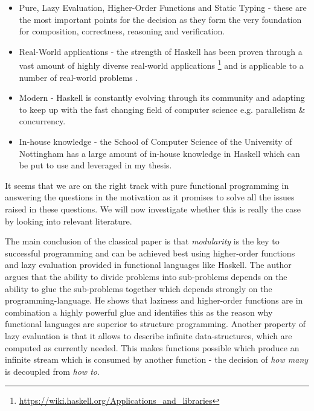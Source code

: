 \begin{itemize}
	\item Pure, Lazy Evaluation, Higher-Order Functions and Static Typing - these are the most important points for the decision as they form the very foundation for composition, correctness, reasoning and verification. 
	\item Real-World applications - the strength of Haskell has been proven through a vast amount of highly diverse real-world applications \footnote{\url{https://wiki.haskell.org/Applications_and_libraries}} \cite{hudak_history_2007} and is applicable to a number of real-world problems \cite{osullivan_real_2008}.
	\item Modern - Haskell is constantly evolving through its community and adapting to keep up with the fast changing field of computer science e.g. parallelism \& concurrency.
	\item In-house knowledge - the School of Computer Science of the University of Nottingham has a large amount of in-house knowledge in Haskell which can be put to use and leveraged in my thesis.
\end{itemize}

It seems that we are on the right track with pure functional programming in answering the questions in the motivation as it promises to solve all the issues raised in these questions. We will now investigate whether this is really the case by looking into relevant literature.

The main conclusion of the classical paper \cite{hughes_why_1989} is that \textit{modularity} is the key to successful programming and can be achieved best using higher-order functions and lazy evaluation provided in functional languages like Haskell. The author argues that the ability to divide problems into sub-problems depends on the ability to glue the sub-problems together which depends strongly on the programming-language. He shows that laziness and higher-order functions are in combination a highly powerful glue and identifies this as the reason why functional languages are superior to structure programming. Another property of lazy evaluation is that it allows to describe infinite data-structures, which are computed as currently needed. This makes functions possible which produce an infinite stream which is consumed by another function - the decision of \textit{how many} is decoupled from \textit{how to}.

